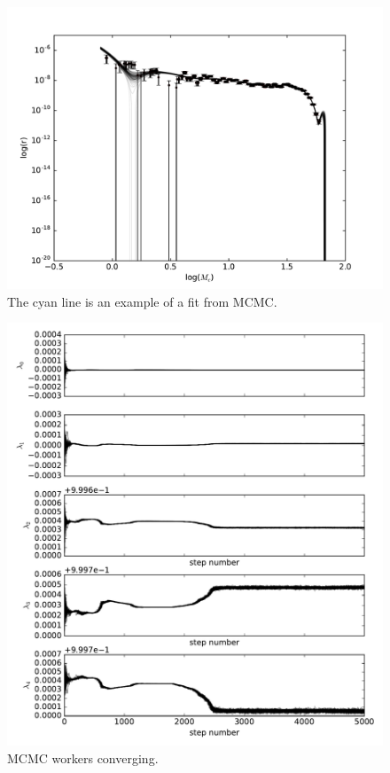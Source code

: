 \begin{figure}[ht]
  \includegraphics[width=\columnwidth]{img/line-mcmc_err.pdf}
  \caption{The cyan line is an example of a fit from MCMC.}
  \label{fig:line_MCMC}
\end{figure}


\begin{figure}[ht]
  \includegraphics[width=\columnwidth]{img/line-time.pdf}
  \caption{MCMC workers converging.}
  \label{fig:MCMC_time}
\end{figure}

